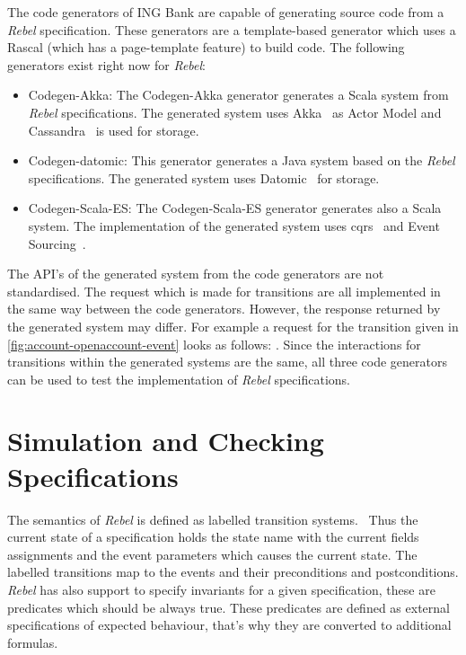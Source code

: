 The code generators of ING Bank are capable of generating source code from a \textit{Rebel} specification. These generators are a template-based generator which uses a Rascal (which has a page-template feature)\cite{RascalGTTSE} to build code. The following generators exist right now for \textit{Rebel}:
\begin{itemize}

\item Codegen-Akka: The Codegen-Akka generator generates a Scala system from
\textit{Rebel} specifications. The generated system uses
Akka~\cite[p.~4]{roestenburg2016akka} as Actor Model and
Cassandra~\cite{lakshman2010cassandra} is used for storage.

\item Codegen-datomic: This generator generates a Java system based on the
\textit{Rebel} specifications. The generated system uses
Datomic~\cite[p.~170-172]{anderson2016professional} for storage.

\item Codegen-Scala-ES: The Codegen-Scala-ES generator generates also a Scala
system. The implementation of the generated system uses
\gls{cqrs}~\cite{fowler2011cqrs} and Event Sourcing~\cite{fowler2005event}.

\end{itemize}

The API's of the generated system from the code generators are not standardised. The request which is made for transitions are all implemented in the same way between the code generators. However, the response returned by the generated system may differ. For example a request for the transition given in \autoref{fig:account-openaccount-event} looks as follows: . Since the interactions for transitions within the generated systems are the same, all three code generators can be used to test the implementation of \textit{Rebel} specifications.

\section{Simulation and Checking Specifications}


The semantics of \textit{Rebel} is defined as labelled transition systems.~\cite[p.~5]{stoel_storm_vinju_bosman_2016} Thus the current state of a specification holds the state name with the current fields assignments and the event parameters which causes the current state. The labelled transitions map to the events and their preconditions and postconditions. \textit{Rebel} has also support to specify invariants for a given specification, these are predicates which should be always true. These predicates are defined as external specifications of expected behaviour, that's why they are converted to additional formulas. 


